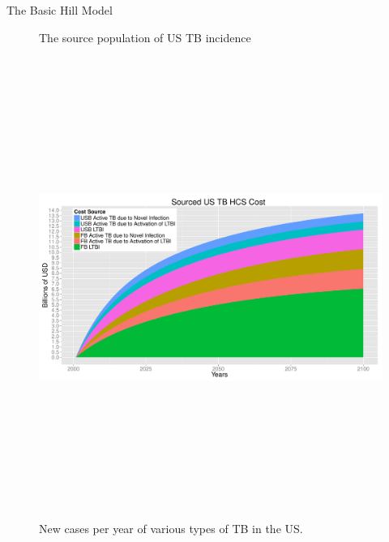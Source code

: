 \documentclass[final]{beamer}
\begin{document}
\begin{frame}
\begin{columns}
\begin{column}{.3\textwidth}
\begin{block}{The Basic Hill Model}
\begin{figure}[h]
\begin{center}
          \end{center}
          \caption{The source population of US TB incidence}
          \label{fig:incPlotSourced}
        \end{figure}
        \vspace{-1em}
        \begin{figure}[h]
          \begin{center}
            \includegraphics[height=15cm]{costPlotSourced}
          \end{center}
          \caption{New cases per year of various types of TB in the US.}
          \label{fig:incPlotTotal}
        \end{figure}
      \end{block}
    \end{column}
    

\end{columns}
\end{frame}
\end{document}
